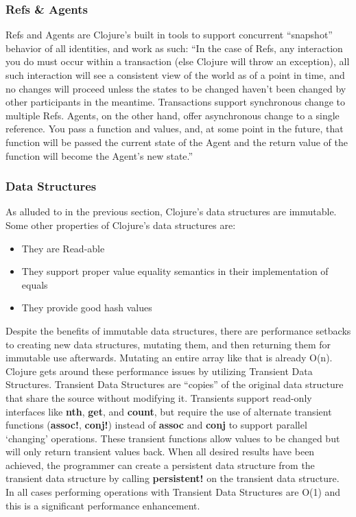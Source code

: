 \subsubsection{Refs \& Agents}

    Refs and Agents are Clojure's built in tools to support concurrent ``snapshot'' behavior of all identities, and work as such: ``In the case of Refs, any interaction you do must occur within a transaction (else Clojure will throw an exception), all such interaction will see a consistent view of the world as of a point in time, and no changes will proceed unless the states to be changed haven’t been changed by other participants in the meantime. Transactions support synchronous change to multiple Refs. Agents, on the other hand, offer asynchronous change to a single reference. You pass a function and values, and, at some point in the future, that function will be passed the current state of the Agent and the return value of the function will become the Agent’s new state.'' \cite{website:clojure-concurrency}



\subsubsection{Data Structures}

    As alluded to in the previous section, Clojure's data structures are immutable. Some other properties of Clojure's data structures are:
    \begin{itemize}
        \item They are Read-able
        \item They support proper value equality semantics in their implementation of equals
        \item They provide good hash values
    \end{itemize}
    \cite{website:clojure-lang-reference} Despite the benefits of immutable data structures, there are performance setbacks to creating new data structures, mutating them, and then returning them for immutable use afterwards. Mutating an entire array like that is already O(n). Clojure gets around these performance issues by utilizing Transient Data Structures. Transient Data Structures are ``copies'' of the original data structure that share the source without modifying it. Transients support read-only interfaces like \textbf{nth}, \textbf{get}, and \textbf{count}, but require the use of alternate transient functions (\textbf{assoc!}, \textbf{conj!}) instead of \textbf{assoc} and \textbf{conj} to support parallel `changing' operations. These transient functions allow values to be changed but will only return transient values back. When all desired results have been achieved, the programmer can create a persistent data structure from the transient data structure by calling \textbf{persistent!} on the transient data structure. In all cases performing operations with Transient Data Structures are O(1) and this is a significant performance enhancement.

